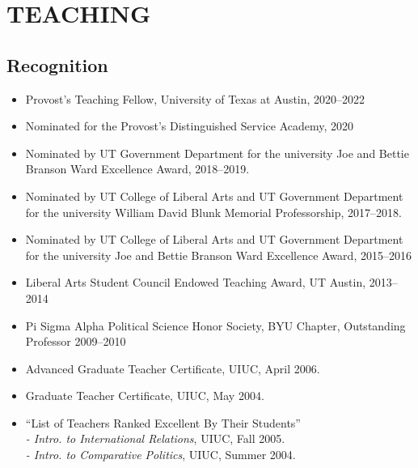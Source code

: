 \documentclass[10pt]{article}
\begin{document}
\section*{TEACHING}
\subsection*{Recognition}
\begin{itemize}\setlength{\itemsep}{1pt}

\item Provost's Teaching Fellow, University of Texas at Austin, 2020--2022

\item Nominated for the Provost's Distinguished Service Academy, 2020

\item Nominated by UT Government Department for the university Joe and Bettie Branson Ward Excellence Award, 2018--2019.

\item Nominated by UT College of Liberal Arts and UT Government Department for the university William David Blunk Memorial Professorship, 2017--2018.

\item Nominated by UT College of Liberal Arts and UT Government Department for the university Joe and Bettie Branson Ward Excellence Award, 2015--2016

\item Liberal Arts Student Council Endowed Teaching Award, UT Austin, 2013--2014

\item Pi Sigma Alpha Political Science Honor Society, BYU Chapter, Outstanding Professor 2009--2010

\item Advanced Graduate Teacher Certificate, UIUC, April 2006.

\item Graduate Teacher Certificate, UIUC, May 2004.

\item ``List of Teachers Ranked Excellent By Their Students'' \\ \indent \textit{- Intro. to International Relations},
UIUC, Fall 2005.  \\ \indent \textit{- Intro. to Comparative Politics}, UIUC, Summer 2004.
\end{itemize}
\end{document}
